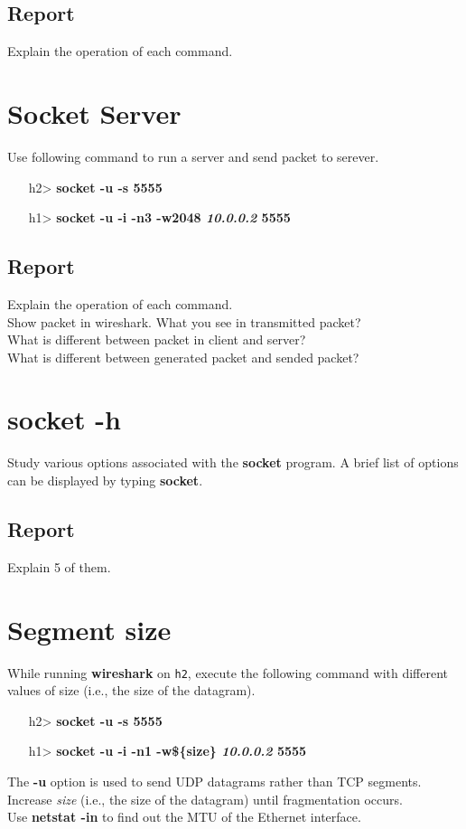 \documentclass[10pt,a4paper]{article}
\numberwithin{equation}{section}
\numberwithin{figure}{section}
\numberwithin{table}{section}
\begin{document}
\subsection*{Report}
Explain the operation of each command.

\section{Socket Server}
Use following command to run a server and send packet to serever.
\begin{itemize}
	\item [h2>] \textbf{socket -u -s 5555}
	\item [h1>] \textbf{socket -u -i -n3 -w2048 \textit{10.0.0.2} 5555}
\end{itemize}

\subsection*{Report}
Explain the operation of each command.\\
Show packet in wireshark. What you see in transmitted packet?\\
What is different between packet in client and server?\\
What is different between generated packet and sended packet?

\section{socket -h}
Study various options associated with the \textbf{socket} program.
A brief list of options can be displayed by typing \textbf{socket}.
\subsection*{Report}
Explain 5 of them.

\section{Segment size}
While running \textbf{wireshark} on \texttt{h2}, execute the following command with different values of size (i.e., the size of the datagram). \\
\begin{itemize}
	\item [h2>] \textbf{socket -u -s 5555}
	\item [h1>] \textbf{socket -u -i -n1 -w\$\{size\} \textit{10.0.0.2} 5555}
\end{itemize}
The \textbf{-u} option is used to send UDP datagrams rather than TCP segments. \\
Increase \textit{size} (i.e., the size of the datagram) until fragmentation occurs. \\
Use \textbf{netstat -in} to find out the MTU of the Ethernet interface.
\end{document}
